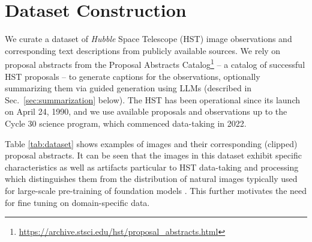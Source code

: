 \documentclass[10pt]{article} %
\newcommand{\hubble}{\emph{Hubble}\xspace}
\newcommand{\datafolder}[1]{\def\thedatafolder{#1}}
\begin{document}
\section{Dataset Construction}
\label{sec:dataset}

We curate a dataset of \hubble Space Telescope (HST) image observations and corresponding text descriptions from publicly available sources.
%
We rely on proposal abstracts from the Proposal Abstracts Catalog\footnote{\url{https://archive.stsci.edu/hst/proposal_abstracts.html}} -- a catalog of successful HST proposals -- to generate captions for the observations, optionally summarizing them via guided generation using LLMs (described in Sec.~\ref{sec:summarization} below).
%
The HST has been operational since its launch on April 24, 1990, and we use available proposals and observations up to the Cycle 30 science program, which commenced data-taking in 2022.
%

Table \ref{tab:dataset} shows examples of images and their corresponding (clipped) proposal abstracts.
%
It can be seen that the images in this dataset exhibit specific characteristics as well as artifacts particular to HST data-taking and processing which distinguishes them from the distribution of natural images typically used for large-scale pre-training of foundation models \citep{deng2009imagenet}.
%
This further motivates the need for fine tuning on domain-specific data.

\datafolder{./plots/data/}
\end{document}
